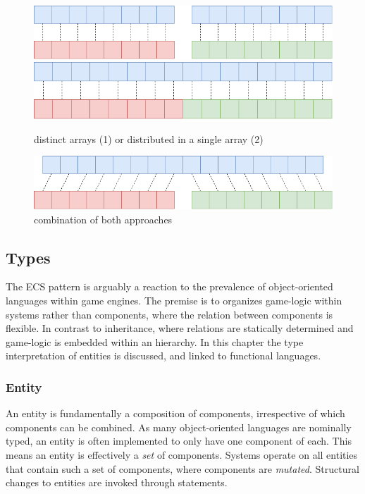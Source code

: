 \documentclass{article}
\begin{document}
\begin{figure}[ht]
    \centering
    \includegraphics[scale=0.3]{variant1}
    \hspace{10pt}
    \includegraphics[scale=0.3]{variant2}
    \caption{distinct arrays (1) or distributed in a single array (2)}
\end{figure}

\begin{figure}[ht]
    \centering
    \includegraphics[scale=0.3]{variant3}
    \caption{combination of both approaches}
\end{figure}

\newpage

\subsection{Types}

The ECS pattern is arguably a reaction to the prevalence of object-oriented languages within game engines.
The premise is to organizes game-logic within systems rather than components, where the relation between components is flexible\cite{ecs-origin}.
In contrast to inheritance, where relations are statically determined and game-logic is embedded within an hierarchy.
In this chapter the type interpretation of entities is discussed, and linked to functional languages.

\subsubsection{Entity}

An entity is fundamentally a composition of components, irrespective of which components can be combined.
As many object-oriented languages are nominally typed, an entity is often implemented to only have one component of each.
This means an entity is effectively a {\it set} of components.
Systems operate on all entities that contain such a set of components, where components are {\it mutated}.
Structural changes to entities are invoked through statements.
\end{document}
